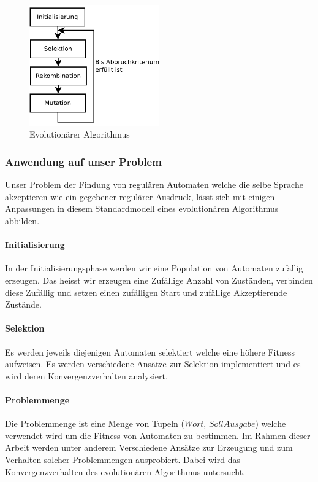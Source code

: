 \begin{figure}[h]
  \centering
  \includegraphics[width=0.5\textwidth]{images/evolutionaerer_algorithmus.pdf}
  \caption[Evolutionärer Algorithmus]{Evolutionärer Algorithmus}
  \label{fig:endlicher_automat}
\end{figure}

\subsubsection{Anwendung auf unser Problem}
Unser Problem der Findung von regulären Automaten welche die selbe Sprache akzeptieren wie ein gegebener regulärer Ausdruck, lässt sich mit einigen Anpassungen in diesem Standardmodell eines evolutionären Algorithmus abbilden.

\paragraph{Initialisierung}
In der Initialisierungsphase werden wir eine Population von Automaten zufällig erzeugen. Das heisst wir erzeugen eine Zufällige Anzahl von Zuständen, verbinden diese Zufällig und setzen einen zufälligen Start und zufällige Akzeptierende Zustände.

\paragraph{Selektion}
Es werden jeweils diejenigen Automaten selektiert welche eine höhere Fitness aufweisen. Es werden verschiedene Ansätze zur Selektion implementiert und es wird deren Konvergenzverhalten analysiert.

\paragraph{Problemmenge}
Die Problemmenge ist eine Menge von Tupeln ($Wort$, $Soll Ausgabe$) welche verwendet wird um die Fitness von Automaten zu bestimmen. Im Rahmen dieser Arbeit werden unter anderem Verschiedene Ansätze zur Erzeugung und zum Verhalten solcher Problemmengen ausprobiert. Dabei wird das Konvergenzverhalten des evolutionären Algorithmus untersucht.

